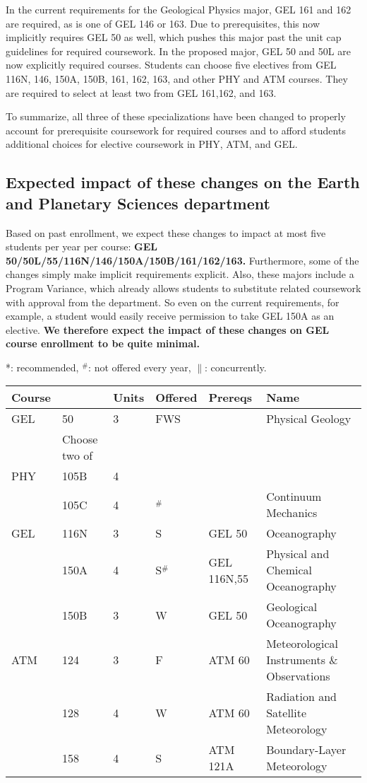 \documentclass[12pt]{article}
\begin{document}
In the current requirements for the Geological Physics major, GEL 161
and 162 are required, as is one of GEL 146 or 163.  Due to
prerequisites, this now implicitly requires GEL 50 as well, which
pushes this major past the unit cap guidelines for required
coursework.  In the proposed major, GEL 50 and 50L are now explicitly
required courses.  Students can choose five electives from GEL 116N,
146, 150A, 150B, 161, 162, 163, and other PHY and ATM courses.  They
are required to select at least two from GEL 161,162, and 163.

To summarize, all three of these specializations have been changed to
properly account for prerequisite coursework for required courses and
to afford students additional choices for elective coursework in PHY,
ATM, and GEL.  

\subsection{Expected impact of these changes on the Earth and Planetary Sciences department}

Based on past enrollment, we expect these changes to impact at most
five students per year per course: {\bf GEL
  50/50L/55/116N/146/150A/150B/161/162/163.}  Furthermore, some of the
changes simply make implicit requirements explicit.  Also, these
majors include a Program Variance, which already allows students to
substitute related coursework with approval from the department.  So
even on the current requirements, for example, a student would easily
receive permission to take GEL 150A as an elective.  {\bf We therefore
  expect the impact of these changes on GEL course enrollment to be
  quite minimal.}

\newpage

\vskip 0.25cm
\noindent
*: recommended, $^\#$: not offered every year, $\parallel$: concurrently.\\
\begin{tabular}{|llllll|}
\hline
Course & & Units & Offered & Prereqs & Name \\
\hline
GEL & 50     & 3 & FWS & & Physical Geology \\
\hline
\hline
    & Choose two of & & & & \\
\hline
PHY  & 105B   & 4 & & & \\
     & 105C   & 4 & $^\#$  &             & Continuum Mechanics\\
GEL  & 116N   & 3 & S  & GEL 50      & Oceanography\\
     & 150A   & 4 & S$^\#$ & GEL 116N,55 & Physical and Chemical Oceanography\\
     & 150B   & 3 & W  & GEL 50      & Geological Oceanography\\
ATM  & 124    & 3 & F  & ATM 60      & Meteorological Instruments \& Observations \\
     & 128    & 4 & W  & ATM 60      & Radiation and Satellite Meteorology \\
     & 158    & 4 & S  & ATM 121A    & Boundary-Layer Meteorology \\
\hline
\end{tabular}\\
\end{document}
